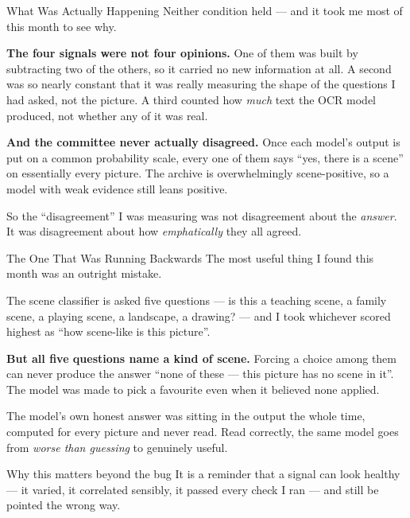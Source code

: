 \documentclass[aspectratio=169,11pt]{beamer}
\begin{document}
\begin{frame}{What Was Actually Happening}
\small
Neither condition held --- and it took me most of this month to see why.
\vspace{2mm}

\small
\textbf{The four signals were not four opinions.} One of them was built by subtracting two of the others, so it carried no new information at all. A second was so nearly constant that it was really measuring the shape of the questions I had asked, not the picture. A third counted how \emph{much} text the OCR model produced, not whether any of it was real.
\vspace{2mm}

\textbf{And the committee never actually disagreed.} Once each model's output is put on a common probability scale, every one of them says ``yes, there is a scene'' on essentially every picture. The archive is overwhelmingly scene-positive, so a model with weak evidence still leans positive.
\vspace{2mm}

So the ``disagreement'' I was measuring was not disagreement about the \emph{answer}. It was disagreement about how \emph{emphatically} they all agreed.
\end{frame}

\begin{frame}{The One That Was Running Backwards}
\small
The most useful thing I found this month was an outright mistake.
\vspace{2mm}

\small
The scene classifier is asked five questions --- is this a teaching scene, a family scene, a playing scene, a landscape, a drawing? --- and I took whichever scored highest as ``how scene-like is this picture''.
\vspace{1.5mm}

\textbf{But all five questions name a kind of scene.} Forcing a choice among them can never produce the answer ``none of these --- this picture has no scene in it''. The model was made to pick a favourite even when it believed none applied.
\vspace{2mm}

The model's own honest answer was sitting in the output the whole time, computed for every picture and never read. Read correctly, the same model goes from \emph{worse than guessing} to genuinely useful.
\vspace{2mm}

\begin{alertblock}{\small Why this matters beyond the bug}
It is a reminder that a signal can look healthy --- it varied, it correlated sensibly, it passed every check I ran --- and still be pointed the wrong way.
\end{alertblock}
\end{frame}
\end{document}
